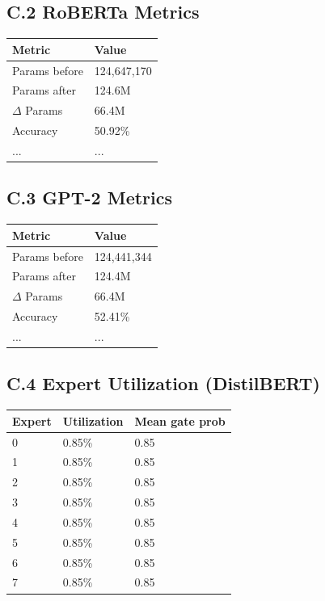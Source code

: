 \subsection{C.2 RoBERTa Metrics}

\begin{table}[H]
\centering
\small
\begin{tabular}{ll}
\toprule
\textbf{Metric} & \textbf{Value} \\
\midrule
Params before & 124,647,170 \\
Params after & 124.6M \\
$\Delta$ Params & 66.4M \\
Accuracy & 50.92\% \\
... & ... \\
\bottomrule
\end{tabular}
\end{table}

\subsection{C.3 GPT-2 Metrics}

\begin{table}[H]
\centering
\small
\begin{tabular}{ll}
\toprule
\textbf{Metric} & \textbf{Value} \\
\midrule
Params before & 124,441,344 \\
Params after & 124.4M \\
$\Delta$ Params & 66.4M \\
Accuracy & 52.41\% \\
... & ... \\
\bottomrule
\end{tabular}
\end{table}

\subsection{C.4 Expert Utilization (DistilBERT)}

\begin{table}[H]
\centering
\small
\begin{tabular}{lll}
\toprule
\textbf{Expert} & \textbf{Utilization} & \textbf{Mean gate prob} \\
\midrule
0 & 0.85\% & 0.85 \\
1 & 0.85\% & 0.85 \\
2 & 0.85\% & 0.85 \\
3 & 0.85\% & 0.85 \\
4 & 0.85\% & 0.85 \\
5 & 0.85\% & 0.85 \\
6 & 0.85\% & 0.85 \\
7 & 0.85\% & 0.85 \\
\bottomrule
\end{tabular}
\end{table}

